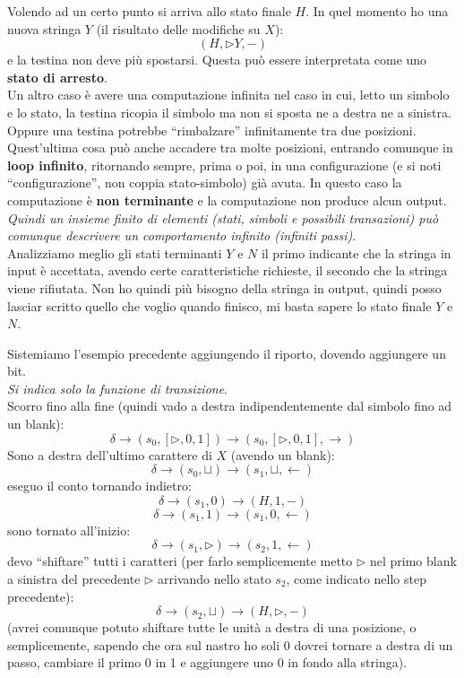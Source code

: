 \documentclass[a4paper,12pt, oneside]{book}
\begin{document}
Volendo ad un certo punto si arriva allo stato finale $H$. In quel momento ho
una nuova stringa $Y$ (il risultato delle modifiche su $X$):
\[(H,\triangleright Y, -)\]
e la testina non deve più spostarsi. Questa può essere interpretata come uno
\textbf{stato di arresto}.\\
Un altro caso è avere una computazione infinita nel caso in cui, letto un
simbolo e lo stato, la testina ricopia il simbolo ma non si sposta ne a destra
ne a sinistra. Oppure una testina potrebbe ``rimbalzare'' infinitamente tra due
posizioni. Quest'ultima cosa può anche accadere tra molte posizioni, entrando
comunque in \textbf{loop infinito}, ritornando sempre, prima o poi, in una
configurazione (e si noti ``configurazione'', non coppia stato-simbolo) già
avuta. In questo caso la computazione è \textbf{non terminante} e la
computazione non produce alcun output. \textit{Quindi un insieme finito di
  elementi (stati, simboli e possibili transazioni) può comunque descrivere un
  comportamento infinito (infiniti passi)}.\\ 
Analizziamo meglio gli stati terminanti $Y$ e $N$ il primo indicante che la
stringa in input è accettata, avendo certe caratteristiche richieste, il secondo
che la stringa viene rifiutata. Non ho quindi più bisogno della stringa in
output, quindi posso lasciar scritto quello che voglio quando finisco, mi basta
sapere lo stato finale $Y$ e $N$.
\begin{esempio}
  Sistemiamo l'esempio precedente aggiungendo il riporto, dovendo aggiungere un
  bit. \\
 \textit{Si indica solo la funzione di transizione}.\\
  Scorro fino alla fine (quindi vado a destra indipendentemente dal simbolo fino
  ad un blank):
  \[\delta\to(s_0,[\triangleright, 0,1])\to(s_0,[\triangleright, 0,1],
    \rightarrow)\]
  Sono a destra dell'ultimo carattere di $X$ (avendo un blank):
  \[\delta\to(s_0,\sqcup)\to(s_1,\sqcup,\leftarrow)\]
  eseguo il conto tornando indietro:
  \[\delta\to(s_1,0)\to(H,1,-)\]
  \[\delta\to(s_1,1)\to(s_1,0,\leftarrow)\]
  sono tornato all'inizio:
  \[\delta\to(s_1,\triangleright)\to(s_2,1,\leftarrow)\]
  devo ``shiftare'' tutti i caratteri (per farlo semplicemente metto
  $\triangleright$ nel primo blank a sinistra del precedente $\triangleright$
  arrivando nello stato $s_2$, come indicato nello step precedente):
  \[\delta\to(s_2,\sqcup)\to(H,\triangleright,-)\]
  (avrei comunque potuto shiftare tutte le unità a destra di una posizione, o
  semplicemente, sapendo che ora sul nastro ho soli 0 dovrei tornare a destra di
  un passo, cambiare il primo 0 in 1 e aggiungere uno 0 in fondo alla
  stringa).
\end{esempio}
\end{document}
